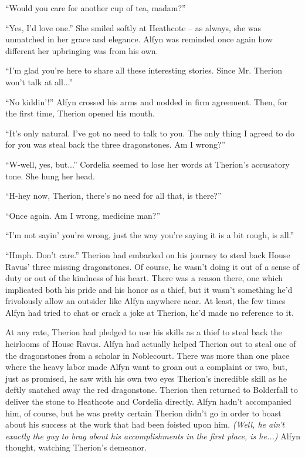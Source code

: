 ``Would you care for another cup of tea, madam?''

``Yes, I'd love one.'' She smiled softly at Heathcote -- as always, she was unmatched in her grace and elegance. Alfyn was reminded once again how different her upbringing was from his own.

``I'm glad you're here to share all these interesting stories. Since Mr. Therion won't talk at all...''

``No kiddin'!'' Alfyn crossed his arms and nodded in firm agreement. Then, for the first time, Therion opened his mouth.

``It's only natural. I've got no need to talk to you. The only thing I agreed to do for you was steal back the three dragonstones. Am I wrong?''

``W-well, yes, but...'' Cordelia seemed to lose her words at Therion's accusatory tone. She hung her head.

``H-hey now, Therion, there's no need for all that, is there?''

``Once again. Am I wrong, medicine man?''

``I'm not sayin' you're wrong, just the way you're saying it is a bit rough, is all.''

``Hmph. Don't care.'' Therion had embarked on his journey to steal back House Ravus' three missing dragonstones. Of course, he wasn't doing it out of a sense of duty or out of the kindness of his heart. There was a reason there, one which implicated both his pride and his honor as a thief, but it wasn't something he'd frivolously allow an outsider like Alfyn anywhere near. At least, the few times Alfyn had tried to chat or crack a joke at Therion, he'd made no reference to it.

At any rate, Therion had pledged to use his skills as a thief to steal back the heirlooms of House Ravus. Alfyn had actually helped Therion out to steal one of the dragonstones from a scholar in Noblecourt. There was more than one place where the heavy labor made Alfyn want to groan out a complaint or two, but, just as promised, he saw with his own two eyes Therion's incredible skill as he deftly snatched away the red dragonstone.  Therion then returned to Bolderfall to deliver the stone to Heathcote and Cordelia directly. Alfyn hadn't accompanied him, of course, but he was pretty certain Therion didn't go in order to boast about his success at the work that had been foisted upon him. \emph{(Well, he ain't exactly the guy to brag about his accomplishments in the first place, is he...)} Alfyn thought, watching Therion's demeanor.

